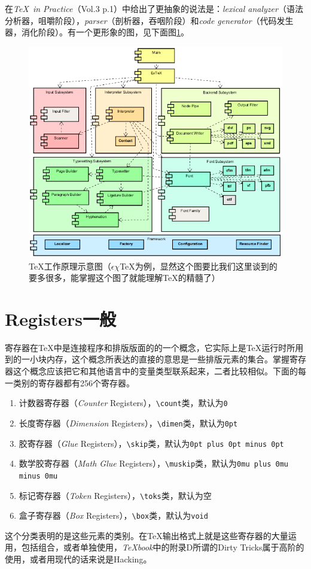 \documentclass{article}
\newcommand{\TeXbook}{\textit{\TeX book}}
\newcommand{\TIP}{\textit{\TeX\ in Practice}}
\begin{document}
在\TIP （Vol.3 p.1）中给出了更抽象的说法是：\textit{lexical analyzer}（语法分析器，咀嚼阶段），\textit{parser}（剖析器，吞咽阶段）和\textit{code generator}（代码发生器，消化阶段）。有一个更形象的图，见下面图\ref{fig1}。
\begin{figure}[!ht]
\centering
\includegraphics[width=.6\textwidth]{components.png}
\caption{\TeX 工作原理示意图（$\epsilon\chi$\TeX 为例，显然这个图要比我们这里谈到的要多很多，能掌握这个图了就能理解\TeX 的精髓了）\label{fig1}}
\end{figure}

\section{Registers一般}
寄存器在\TeX 中是连接程序和排版版面的的一个概念，它实际上是\TeX 运行时所用到的一小块内存，这个概念所表达的直接的意思是一些排版元素的集合。掌握寄存器这个概念应该把它和其他语言中的变量类型联系起来，二者比较相似。下面的每一类别的寄存器都有256个寄存器。
\begin{enumerate}
\item 计数器寄存器（\textit{Counter} Registers），\verb!\count!类，默认为\texttt{0}
\item 长度寄存器（\textit{Dimension} Registers），\verb!\dimen!类，默认为\verb!0pt!
\item 胶寄存器（\textit{Glue} Registers），\verb!\skip!类，默认为\verb!0pt plus 0pt minus 0pt!
\item 数学胶寄存器（\textit{Math Glue} Registers），\verb!\muskip!类，默认为\verb!0mu plus 0mu minus 0mu!
\item 标记寄存器（\textit{Token} Registers），\verb!\toks!类，默认为空
\item 盒子寄存器（\textit{Box} Registers），\verb!\box!类，默认为\texttt{void}
\end{enumerate}
这个分类表明的是这些元素的类别。在\TeX 输出格式上就是这些寄存器的大量运用，包括组合，或者单独使用，\TeXbook 中的附录D所谓的Dirty Tricks属于高阶的使用，或者用现代的话来说是Hacking。
\end{document}
